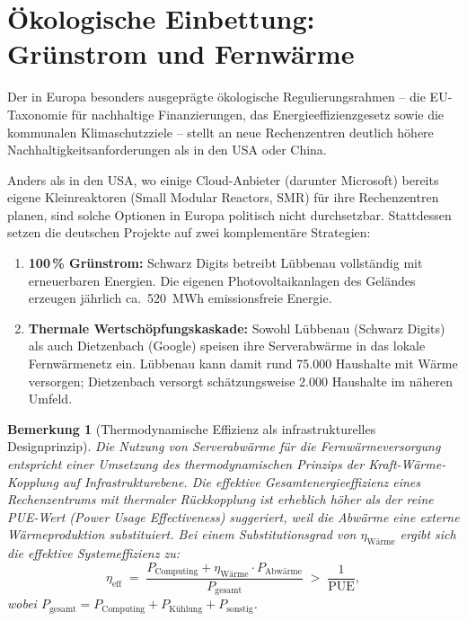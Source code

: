 ﻿\documentclass[12pt, a4paper, openany]{report}
\newtheorem{remark}[theorem]{Bemerkung}
\begin{document}
\section{Ökologische Einbettung: Grünstrom und Fernwärme}
\label{sec:oekologie}

Der in Europa besonders ausgeprägte ökologische Regulierungsrahmen -- die
EU-Taxonomie für nachhaltige Finanzierungen, das Energieeffizienzgesetz sowie
die kommunalen Klimaschutzziele -- stellt an neue Rechenzentren deutlich
höhere Nachhaltigkeitsanforderungen als in den USA oder China.

Anders als in den USA, wo einige Cloud-Anbieter (darunter Microsoft) bereits
eigene Kleinreaktoren (Small Modular Reactors, SMR) für ihre
Rechenzentren planen, sind solche Optionen in Europa politisch nicht
durchsetzbar. Stattdessen setzen die deutschen Projekte auf zwei
komplementäre Strategien:

\begin{enumerate}[label=(\arabic*)]
	\item \textbf{100\,\% Grünstrom:} Schwarz Digits betreibt Lübbenau
	vollständig mit erneuerbaren Energien. Die eigenen Photovoltaikanlagen
	des Geländes erzeugen jährlich ca.\ 520~MWh emissionsfreie Energie.
	\item \textbf{Thermale Wertschöpfungskaskade:} Sowohl Lübbenau (Schwarz
	Digits) als auch Dietzenbach (Google) speisen ihre Serverabwärme in
	das lokale Fernwärmenetz ein. Lübbenau kann damit rund 75.000 Haushalte
	mit Wärme versorgen; Dietzenbach versorgt schätzungsweise 2.000 Haushalte
	im näheren Umfeld.
\end{enumerate}

\begin{remark}[Thermodynamische Effizienz als infrastrukturelles Designprinzip]
	\label{rem:thermodynamik}
	Die Nutzung von Serverabwärme für die Fernwärmeversorgung entspricht einer
	Umsetzung des thermodynamischen Prinzips der Kraft-Wärme-Kopplung auf
	Infrastrukturebene. Die effektive Gesamtenergieeffizienz eines Rechenzentrums
	mit thermaler Rückkopplung ist erheblich höher als der reine
	PUE-Wert (Power Usage Effectiveness) suggeriert, weil die Abwärme eine
	externe Wärmeproduktion substituiert. Bei einem Substitutionsgrad von
	$\eta_{\text{Wärme}}$ ergibt sich die effektive Systemeffizienz zu:
	\[
	\eta_{\text{eff}}
	\;=\;
	\frac{P_{\text{Computing}} + \eta_{\text{Wärme}} \cdot P_{\text{Abwärme}}}
	{P_{\text{gesamt}}}
	\;>\; \frac{1}{\text{PUE}},
	\]
	wobei $P_{\text{gesamt}} = P_{\text{Computing}} + P_{\text{Kühlung}} + P_{\text{sonstig}}$.
\end{remark}
\end{document}
